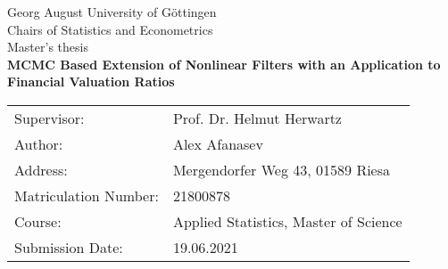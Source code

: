 \begin{titlepage}
	\begin{center}
	\vspace*{4cm}
	{\LARGE Georg August University of Göttingen}\\
	\vskip 1.5cm
	{\large Chairs of Statistics and Econometrics}\\
	\vskip 0.5cm
	{\large Master's thesis}\\
	\vskip 2.0cm
	{\LARGE\textbf{MCMC Based Extension of Nonlinear Filters with an Application to Financial Valuation Ratios}}\\
	\end{center}
\vfill
\vfill
\begin{tabular}{ll}
	Supervisor: & Prof. Dr. Helmut Herwartz \\
	Author: & Alex Afanasev \\
	Address: & Mergendorfer Weg 43, 01589 Riesa \\
	Matriculation Number: & 21800878 \\
	Course: & Applied Statistics, Master of Science \\
	Submission Date: & 19.06.2021 \\
\end{tabular}
\end{titlepage}
